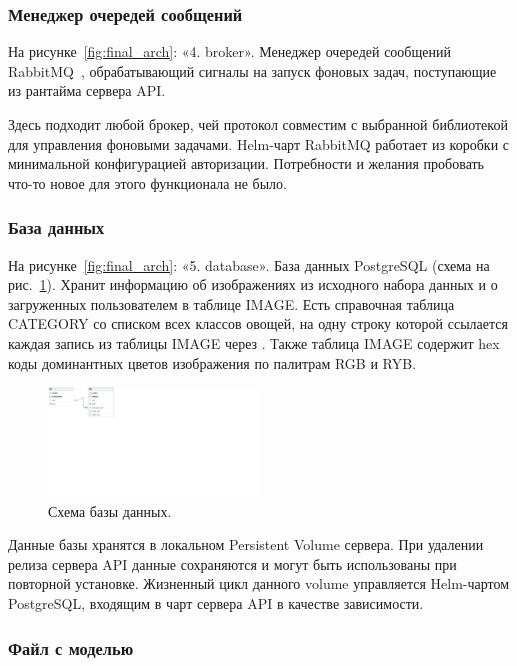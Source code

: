 \documentclass[a4paper,12pt]{extarticle}
\begin{document}
\subsubsection{Менеджер очередей сообщений}

На рисунке~\ref{fig:final_arch}: «4. broker». Менеджер очередей сообщений RabbitMQ~\cite{rabbitmq},
обрабатывающий сигналы на запуск фоновых задач, поступающие из рантайма сервера API.

Здесь подходит любой брокер, чей протокол совместим с выбранной библиотекой для управления фоновыми
задачами. Helm-чарт RabbitMQ работает из коробки с минимальной конфигурацией авторизации. Потребности
и желания пробовать что-то новое для этого функционала не было.

\subsubsection{База данных}

На рисунке~\ref{fig:final_arch}: «5. database». База данных PostgreSQL
(схема на рис.~\ref{fig:database}). Хранит информацию об
изображениях из исходного набора данных и о загруженных пользователем в таблице IMAGE. Есть
справочная таблица CATEGORY со списком всех классов овощей, на одну строку которой ссылается каждая
запись из таблицы IMAGE через . Также таблица IMAGE содержит hex коды
доминантных цветов изображения по палитрам RGB и RYB.

\begin{figure}[ht]
	\centering
	\includegraphics[width=0.5\textwidth,trim={0 18cm 34cm 0}]{database.png}
	\caption{Схема базы данных.}
	\label{fig:database}
\end{figure}

Данные базы хранятся в локальном Persistent Volume сервера. При удалении релиза сервера API данные
сохраняются и могут быть использованы при повторной установке. Жизненный цикл данного volume управляется
Helm-чартом PostgreSQL, входящим в чарт сервера API в качестве зависимости.

\subsubsection{Файл с моделью}
\end{document}
